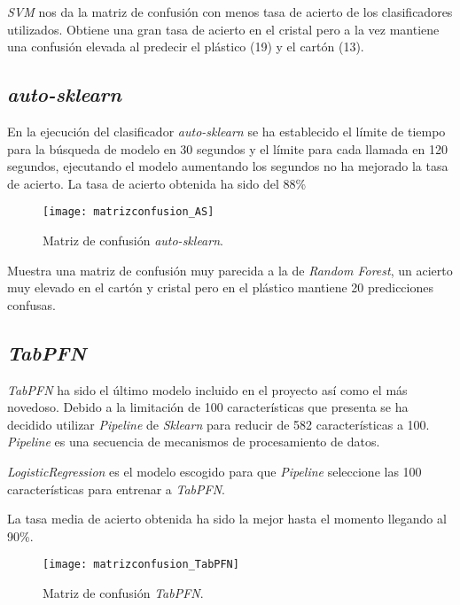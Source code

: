 \textit{SVM} nos da la matriz de confusión con menos tasa de acierto de los clasificadores utilizados. Obtiene una gran tasa de acierto en el cristal pero a la vez mantiene una confusión elevada al predecir el plástico (19) y el cartón (13).
\clearpage

\subsection{\textit{auto-sklearn}}

En la ejecución del clasificador \textit{auto-sklearn} se ha establecido el límite de tiempo para la búsqueda de modelo en 30 segundos y el límite para cada llamada en 120 segundos, ejecutando el modelo aumentando los segundos no ha mejorado la tasa de acierto. La tasa de acierto obtenida ha sido del 88\%

\begin{figure}[h]
\begin{center}
	\texttt{[image: matrizconfusion\_AS]}
	\caption{Matriz de confusión \textit{auto-sklearn}.}
	\label{fig:matrizconfusion_AS}
\end{center}
\end{figure}

Muestra una matriz de confusión muy parecida a la de \textit{Random Forest}, un acierto muy elevado en el cartón y cristal pero en el plástico mantiene 20 predicciones confusas.

\clearpage

\subsection{\textit{TabPFN}}

\textit{TabPFN} ha sido el último modelo incluido en el proyecto así como el más novedoso. Debido a la limitación de 100 características que presenta se ha decidido utilizar \textit{Pipeline} de \textit{Sklearn} para reducir de 582 características a 100. \textit{Pipeline} es una secuencia de mecanismos de procesamiento de datos.

\textit{LogisticRegression} es el modelo escogido para que \textit{Pipeline} seleccione las 100 características para entrenar a \textit{TabPFN}.

La tasa media de acierto obtenida ha sido la mejor hasta el momento llegando al 90\%.

\begin{figure}[h]
\begin{center}
	\texttt{[image: matrizconfusion\_TabPFN]}
	\caption{Matriz de confusión \textit{TabPFN}.}
	\label{fig:matrizconfusion_TabPFN}
\end{center}
\end{figure}

